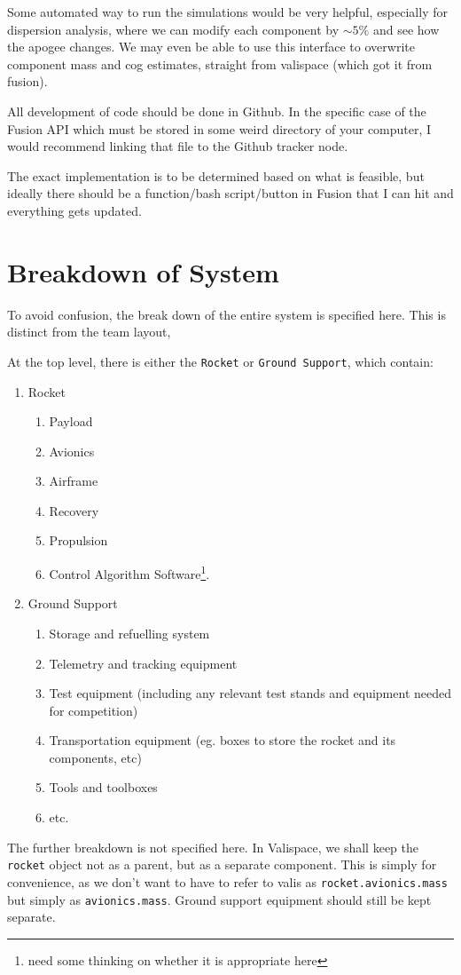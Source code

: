 \documentclass[12pt]{article}
\begin{document}
Some automated way to run the simulations would be very helpful, especially for dispersion analysis, where we can modify each component by $\sim5\%$ and see how the apogee changes. We may even be able to use this interface to overwrite component mass and cog estimates, straight from valispace (which got it from fusion). 

All development of code should be done in Github. In the specific case of the Fusion API which must be stored in some weird directory of your computer, I would recommend linking that file to the Github tracker node. 

The exact implementation is to be determined based on what is feasible, but ideally there should be a function/bash script/button in Fusion that I can hit and everything gets updated. 


\section{Breakdown of System}

To avoid confusion, the  break down of  the entire system is specified here. This is distinct from the team layout, 

At the top level, there is either the \texttt{Rocket} or \texttt{Ground Support}, which contain:

\begin{enumerate}
\item Rocket
\begin{enumerate}
\item Payload
\item Avionics
\item Airframe
\item Recovery
\item Propulsion
\item Control Algorithm Software\footnote{need some thinking on whether it is appropriate here}.
\end{enumerate}
\item Ground Support
\begin{enumerate}
\item Storage and refuelling system
\item Telemetry and tracking equipment
\item Test equipment (including any relevant test stands and equipment needed for competition)
\item Transportation equipment (eg. boxes to store the rocket and its components, etc)
\item Tools and toolboxes 
\item etc. 
\end{enumerate}
\end{enumerate}

The  further breakdown is not specified here. In Valispace, we shall keep the \texttt{rocket} object not as a parent, but as a separate component. This is simply for convenience, as we don't want to have to refer to valis as \texttt{rocket.avionics.mass} but simply as \texttt{avionics.mass}. Ground support equipment should still be kept separate. 
\end{document}
